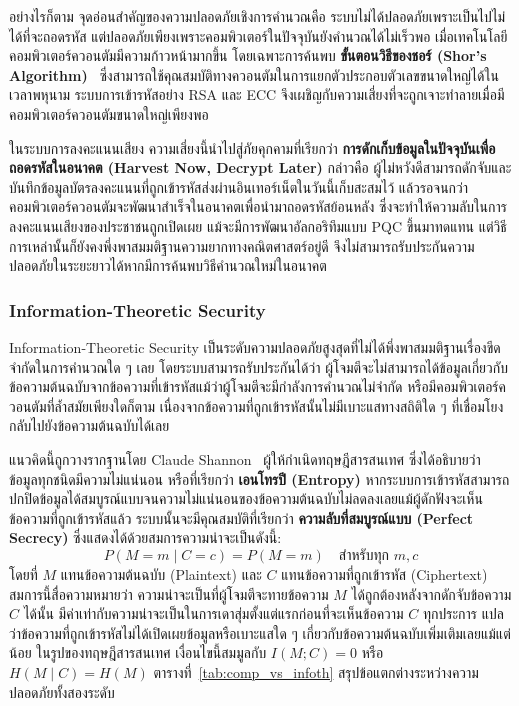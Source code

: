 อย่างไรก็ตาม จุดอ่อนสำคัญของความปลอดภัยเชิงการคำนวณคือ ระบบไม่ได้ปลอดภัยเพราะเป็นไปไม่ได้ที่จะถอดรหัส แต่ปลอดภัยเพียงเพราะคอมพิวเตอร์ในปัจจุบันยังคำนวณได้ไม่เร็วพอ เมื่อเทคโนโลยีคอมพิวเตอร์ควอนตัมมีความก้าวหน้ามากขึ้น โดยเฉพาะการค้นพบ \textbf{ขั้นตอนวิธีของชอร์ (Shor's Algorithm)}~\cite{shor_1994} ซึ่งสามารถใช้คุณสมบัติทางควอนตัมในการแยกตัวประกอบตัวเลขขนาดใหญ่ได้ในเวลาพหุนาม ระบบการเข้ารหัสอย่าง RSA และ ECC จึงเผชิญกับความเสี่ยงที่จะถูกเจาะทำลายเมื่อมีคอมพิวเตอร์ควอนตัมขนาดใหญ่เพียงพอ

ในระบบการลงคะแนนเสียง ความเสี่ยงนี้นำไปสู่ภัยคุกคามที่เรียกว่า \textbf{การดักเก็บข้อมูลในปัจจุบันเพื่อถอดรหัสในอนาคต (Harvest Now, Decrypt Later)} กล่าวคือ ผู้ไม่หวังดีสามารถดักจับและบันทึกข้อมูลบัตรลงคะแนนที่ถูกเข้ารหัสส่งผ่านอินเทอร์เน็ตในวันนี้เก็บสะสมไว้ แล้วรอจนกว่าคอมพิวเตอร์ควอนตัมจะพัฒนาสำเร็จในอนาคตเพื่อนำมาถอดรหัสย้อนหลัง ซึ่งจะทำให้ความลับในการลงคะแนนเสียงของประชาชนถูกเปิดเผย แม้จะมีการพัฒนาอัลกอริทึมแบบ PQC ขึ้นมาทดแทน แต่วิธีการเหล่านั้นก็ยังคงพึ่งพาสมมติฐานความยากทางคณิตศาสตร์อยู่ดี จึงไม่สามารถรับประกันความปลอดภัยในระยะยาวได้หากมีการค้นพบวิธีคำนวณใหม่ในอนาคต

\subsubsection{Information-Theoretic Security}
Information-Theoretic Security เป็นระดับความปลอดภัยสูงสุดที่ไม่ได้พึ่งพาสมมติฐานเรื่องขีดจำกัดในการคำนวณใด ๆ เลย โดยระบบสามารถรับประกันได้ว่า ผู้โจมตีจะไม่สามารถได้ข้อมูลเกี่ยวกับข้อความต้นฉบับจากข้อความที่เข้ารหัสแม้ว่าผู้โจมตีจะมีกำลังการคำนวณไม่จำกัด หรือมีคอมพิวเตอร์ควอนตัมที่ล้ำสมัยเพียงใดก็ตาม เนื่องจากข้อความที่ถูกเข้ารหัสนั้นไม่มีเบาะแสทางสถิติใด ๆ ที่เชื่อมโยงกลับไปยังข้อความต้นฉบับได้เลย

แนวคิดนี้ถูกวางรากฐานโดย Claude Shannon~\cite{shannon_secure} ผู้ให้กำเนิดทฤษฎีสารสนเทศ ซึ่งได้อธิบายว่า ข้อมูลทุกชนิดมีความไม่แน่นอน หรือที่เรียกว่า \textbf{เอนโทรปี (Entropy)} หากระบบการเข้ารหัสสามารถปกปิดข้อมูลได้สมบูรณ์แบบจนความไม่แน่นอนของข้อความต้นฉบับไม่ลดลงเลยแม้ผู้ดักฟังจะเห็นข้อความที่ถูกเข้ารหัสแล้ว ระบบนั้นจะมีคุณสมบัติที่เรียกว่า \textbf{ความลับที่สมบูรณ์แบบ (Perfect Secrecy)} ซึ่งแสดงได้ด้วยสมการความน่าจะเป็นดังนี้:
\begin{equation}
    P(M = m \mid C = c) = P(M = m) \quad \text{สำหรับทุก } m, c
    \label{eq:perfect_secrecy}
\end{equation}
โดยที่ $M$ แทนข้อความต้นฉบับ (Plaintext) และ $C$ แทนข้อความที่ถูกเข้ารหัส (Ciphertext) สมการนี้สื่อความหมายว่า ความน่าจะเป็นที่ผู้โจมตีจะทายข้อความ $M$ ได้ถูกต้องหลังจากดักจับข้อความ $C$ ได้นั้น มีค่าเท่ากับความน่าจะเป็นในการเดาสุ่มตั้งแต่แรกก่อนที่จะเห็นข้อความ $C$ ทุกประการ แปลว่าข้อความที่ถูกเข้ารหัสไม่ได้เปิดเผยข้อมูลหรือเบาะแสใด ๆ เกี่ยวกับข้อความต้นฉบับเพิ่มเติมเลยแม้แต่น้อย ในรูปของทฤษฎีสารสนเทศ เงื่อนไขนี้สมมูลกับ $I(M;C)=0$ หรือ $H(M \mid C) = H(M)$ ตารางที่~\ref{tab:comp_vs_infoth} สรุปข้อแตกต่างระหว่างความปลอดภัยทั้งสองระดับ

